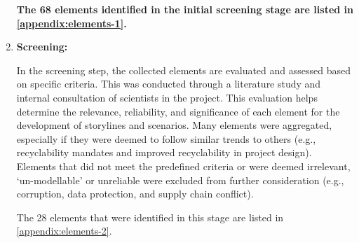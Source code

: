 \begin{enumerate}

        \vspace{\baselineskip}
        \textbf{The 68 elements identified in the initial screening stage are listed in \autoref{appendix:elements-1}.}

        \vspace{\baselineskip}

  \item \textbf{Screening:}

        In the screening step, the collected elements are evaluated and assessed based on specific criteria. This was conducted through a literature study and internal consultation of scientists in the project. This evaluation helps determine the relevance, reliability, and significance of each element for the development of storylines and scenarios. Many elements were aggregated, especially if they were deemed to follow similar trends to others (e.g., recyclability mandates and improved recyclability in project design). Elements that did not meet the predefined criteria or were deemed irrelevant, `un-modellable' or unreliable were excluded from further consideration (e.g., corruption, data protection, and supply chain conflict).

        \vspace{\baselineskip}

        The 28 elements that were identified in this stage are listed in \autoref{appendix:elements-2}.

        \vspace{\baselineskip}


\end{enumerate}

